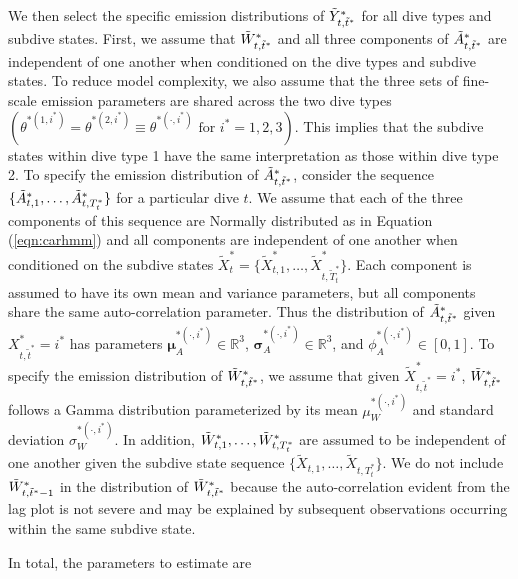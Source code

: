 We then select the specific emission distributions of $\tilde{Y}^*_{t,\tilde t^*}$ for all dive types and subdive states. First, we assume that $\tilde{W}^*_{t,\tilde t^*}$ and all three components of $\tilde{A}^*_{t,\tilde t^*}$ are independent of one another when conditioned on the dive types and subdive states. To reduce model complexity, we also assume that the three sets of fine-scale emission parameters are shared across the two dive types $\left(\theta^{*(1,i^*)} = \theta^{*(2,i^*)} \equiv \theta^{*(\cdot,i^*)} \text{ for } i^* = 1,2,3\right)$. This implies that the subdive states within dive type 1 have the same interpretation as those within dive type 2.
To specify the emission distribution of $\tilde{A}^*_{t,\tilde t^*}$, consider the sequence $\{\tilde{A}^*_{t,1},\ldots,\tilde{A}^*_{t,T^*_t}\}$ for a particular dive $t$. We assume that each of the three components of this sequence are Normally distributed as in Equation (\ref{eqn:carhmm}) and all components are independent of one another when conditioned on the subdive states $\tilde X^*_t = \{\tilde X^*_{t,1},\ldots,\tilde X^*_{t,\tilde T^*_t}\}$. Each component is assumed to have its own mean and variance parameters, but all components share the same auto-correlation parameter. Thus the distribution of $\tilde{A}^*_{t,\tilde t^*}$ given $X^*_{t,\tilde t^*} = i^*$ has parameters $\mathbf{\mu}_A^{*(\cdot,i^*)} \in \mathbb{R}^3$, $\mathbf{\sigma}_A^{*(\cdot,i^*)} \in \mathbb{R}^3$, and $\phi_A^{*(\cdot,i^*)} \in [0,1]$.
To specify the emission distribution of $\tilde{W}^*_{t,\tilde t^*}$, we assume that given $\tilde X^*_{t,\tilde t^*} = i^*$, $\tilde{W}^*_{t,\tilde t^*}$ follows a Gamma distribution parameterized by its mean $\mu_W^{*(\cdot,i^*)}$ and standard deviation $\sigma_W^{*(\cdot,i^*)}$. In addition, $\tilde{W}^*_{t,1},\ldots,\tilde{W}^*_{t,T^*_t}$ are assumed to be independent of one another given the subdive state sequence $\big\{\tilde X_{t,1}, \ldots, \tilde X_{t,T_t^*}\big\}$. We do not include $\tilde{W}^*_{t,\tilde t^*-1}$ in the distribution of $\tilde{W}^*_{t,\tilde t^*}$ because the auto-correlation evident from the lag plot is not severe and may be explained by subsequent observations occurring within the same subdive state. 

In total, the parameters to estimate are

